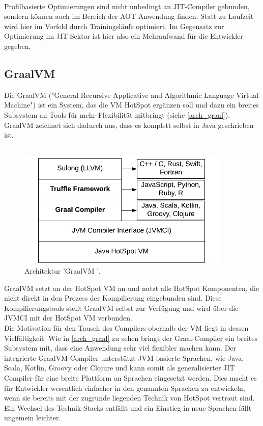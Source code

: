 \\
Profilbasierte Optimierungen sind nicht unbedingt an \ac{JIT}-Compiler gebunden, sondern können auch im Bereich der \ac{AOT} Anwendung finden. Statt zu Laufzeit wird hier im Vorfeld durch Trainingsläufe optimiert. Im Gegensatz zur Optimierung im \ac{JIT}-Sektor ist hier also ein Mehraufwand für die Entwickler gegeben, \cite[vgl. Westrelin 2021, Webseite abgerufen am 02.12.2022]{westrelin_2022}



\subsection{GraalVM }
Die GraalVM ("General Recursive Applicative and Algorithmic Language Virtual Machine")  ist ein System, das die \ac{VM} HotSpot ergänzen soll und dazu ein breites Subsystem an Tools für mehr Flexibilität mitbringt (siehe \autoref{arch_graal}). GraalVM zeichnet sich dadurch aus, dass es komplett selbst in Java geschrieben ist. \\
\\
\begin{figure}[ht]
    \begin{center}
        \includegraphics[width=0.9\textwidth]{assets/img/GraalVM-Architecture.png}
        \caption{Architektur 'GraalVM ', \cite[Quelle: Sipek 2020]{Sipek_2020}}
        \label{arch_graal}
    \end{center}
\end{figure}
GraalVM  setzt an der HotSpot \ac{VM} an und nutzt alle HotSpot Komponenten, die nicht direkt in den Prozess der Kompilierung eingebunden sind. Diese Kompilierungstools stellt GraalVM selbst zur Verfügung und wird über die \ac{JVMCI} mit der HotSpot \ac{VM} verbunden. \\
Die Motivation für den Tausch des Compilers oberhalb der \ac{VM} liegt in dessen Vielfältigkeit. Wie in \autoref{arch_graal} zu sehen bringt der Graal-Compiler ein breites Subsystem mit, dass eine Anwendung sehr viel flexibler machen kann. Der integrierte GraalVM Compiler unterstützt \ac{JVM} basierte Sprachen, wie Java, Scala, Kotlin, Groovy oder Clojure und kann somit als generalisierter \ac{JIT} Compiler für eine breite Plattform an Sprachen eingesetzt werden. Dies macht es für Entwickler wesentlich einfacher in den genannten Sprachen zu entwickeln, wenn sie bereits mit der zugrunde liegenden Technik von HotSpot vertraut sind. Ein Wechsel des Technik-Stacks entfällt und ein Einstieg in neue Sprachen fällt ungemein leichter. \\
